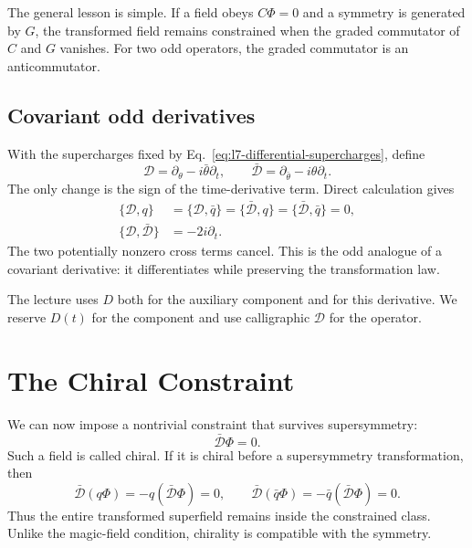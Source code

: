 The general lesson is simple. If a field obeys \(C\Phi=0\) and a symmetry is generated by \(G\), the transformed field remains constrained when the graded commutator of \(C\) and \(G\) vanishes. For two odd operators, the graded commutator is an anticommutator.

\begin{classroomqa}
\end{classroomqa}

\subsection{Covariant odd derivatives}

With the supercharges fixed by Eq.~\eqref{eq:l7-differential-supercharges}, define
\begin{equation}
\mathcal D=\partial_\theta-i\bar\theta\partial_t,
\qquad
\bar{\mathcal D}=\partial_{\bar\theta}-i\theta\partial_t.
\label{eq:l7-covariant-derivatives}
\end{equation}
The only change is the sign of the time-derivative term. Direct calculation gives
\begin{align}
\{\mathcal D,q\}
&=\{\mathcal D,\bar q\}
=\{\bar{\mathcal D},q\}
=\{\bar{\mathcal D},\bar q\}=0,\\
\{\mathcal D,\bar{\mathcal D}\}&=-2i\partial_t.
\label{eq:l7-covariant-algebra}
\end{align}
The two potentially nonzero cross terms cancel. This is the odd analogue of a covariant derivative: it differentiates while preserving the transformation law.

The lecture uses \(D\) both for the auxiliary component and for this derivative. We reserve \(D(t)\) for the component and use calligraphic \(\mathcal D\) for the operator.

\section{The Chiral Constraint}

We can now impose a nontrivial constraint that survives supersymmetry:
\begin{equation}
\bar{\mathcal D}\Phi=0.
\label{eq:l7-chiral-constraint}
\end{equation}
Such a field is called chiral. If it is chiral before a supersymmetry transformation, then
\begin{equation}
\bar{\mathcal D}(q\Phi)
=-q(\bar{\mathcal D}\Phi)=0,
\qquad
\bar{\mathcal D}(\bar q\Phi)
=-\bar q(\bar{\mathcal D}\Phi)=0.
\end{equation}
Thus the entire transformed superfield remains inside the constrained class. Unlike the magic-field condition, chirality is compatible with the symmetry.

